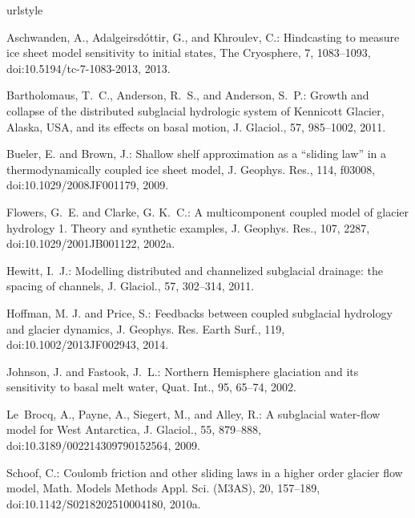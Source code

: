 \documentclass[11pt,reqno]{amsart}
\begin{document}
\begin{thebibliography}{}
\providecommand{\natexlab}[1]{#1}
\providecommand{\url}[1]{{\tt #1}}
\providecommand{\urlprefix}{URL }
\expandafter\ifx\csname urlstyle\endcsname\relax
  \providecommand{\doi}[1]{doi:\discretionary{}{}{}#1}\else
  \providecommand{\doi}{doi:\discretionary{}{}{}\begingroup
  \urlstyle{rm}\Url}\fi

Aschwanden, A., Adalgeirsd{\'o}ttir, G., and Khroulev, C.: Hindcasting to
  measure ice sheet model sensitivity to initial states, The Cryosphere, 7,
  1083--1093, \doi{10.5194/tc-7-1083-2013}, 2013.

Bartholomaus, T.~C., Anderson, R.~S., and Anderson, S.~P.: Growth and collapse
  of the distributed subglacial hydrologic system of {K}ennicott {G}lacier,
  {A}laska, {USA}, and its effects on basal motion, J. Glaciol., 57, 985--1002,
  2011.

Bueler, E. and Brown, J.: Shallow shelf approximation as a ``sliding law'' in a
  thermodynamically coupled ice sheet model, J. Geophys. Res., 114, f03008,
  doi:10.1029/2008JF001179, 2009.

Flowers, G.~E. and Clarke, G. K.~C.: A multicomponent coupled model of glacier
  hydrology 1. {T}heory and synthetic examples, J. Geophys. Res., 107, 2287,
  \doi{10.1029/2001JB001122}, 2002{\natexlab{a}}.

Hewitt, I.~J.: Modelling distributed and channelized subglacial drainage: the
  spacing of channels, J. Glaciol., 57, 302--314, 2011.

Hoffman, M. J. and Price, S.: Feedbacks between coupled subglacial hydrology and glacier dynamics, J. Geophys. Res. Earth Surf., 119, \doi{10.1002/2013JF002943}, 2014.

Johnson, J. and Fastook, J.~L.: Northern {H}emisphere glaciation and its
  sensitivity to basal melt water, Quat. Int., 95, 65--74, 2002.
  
Le~Brocq, A., Payne, A., Siegert, M., and Alley, R.: A subglacial water-flow
  model for {W}est {A}ntarctica, J. Glaciol., 55, 879--888,
  \doi{10.3189/002214309790152564}, 2009.

Schoof, C.: Coulomb friction and other sliding laws in a higher order glacier
  flow model, Math. Models Methods Appl. Sci. (M3AS), 20, 157--189,
  \doi{10.1142/S0218202510004180}, 2010{\natexlab{a}}.


\end{thebibliography}
\end{document}
